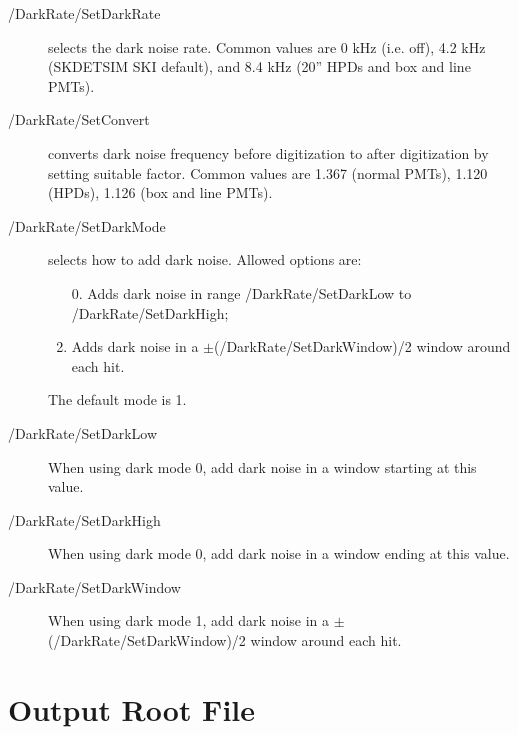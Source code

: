 \begin{description}
\item[/DarkRate/SetDarkRate] selects the dark noise rate. Common values are 0 kHz (i.e. off), 4.2 kHz (SKDETSIM SKI default), and 8.4 kHz (20'' HPDs and box and line PMTs).
\item[/DarkRate/SetConvert] converts dark noise frequency before digitization to after digitization by setting suitable factor. Common values are 1.367 (normal PMTs), 1.120 (HPDs), 1.126 (box and line PMTs).
\item[/DarkRate/SetDarkMode] selects how to add dark noise. Allowed options are:
  \begin{enumerate}
  \item [0.]\setcounter{enumi}{0} Adds dark noise in range /DarkRate/SetDarkLow to /DarkRate/SetDarkHigh;
  \item Adds dark noise in a $\pm$(/DarkRate/SetDarkWindow)/2 window around each hit.
  \end{enumerate}
The default mode is 1.
\item[/DarkRate/SetDarkLow] When using dark mode 0, add dark noise in a window starting at this value.
\item[/DarkRate/SetDarkHigh] When using dark mode 0, add dark noise in a window ending at this value.
\item[/DarkRate/SetDarkWindow] When using dark mode 1, add dark noise in a $\pm$(/DarkRate/SetDarkWindow)/2 window around each hit.
\end{description}

\section{Output Root File}

